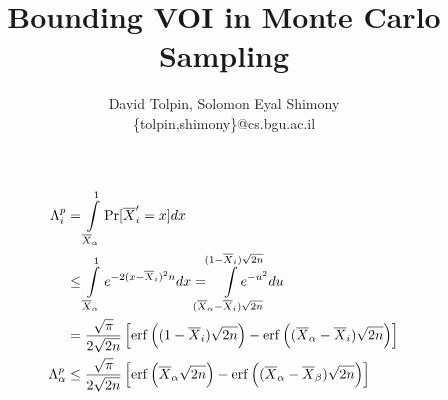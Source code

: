 \documentclass{article}
\title{Bounding VOI in Monte Carlo Sampling}
\author {David Tolpin, Solomon Eyal Shimony \\
\{tolpin,shimony\}@cs.bgu.ac.il}
\begin{document}
\maketitle

\begin{align*}
\Lambda_i^p&=\int\limits_{\overline X_\alpha}^1\Pr[\overline X_i'=x]dx\\
&\le \int\limits_{\overline X_\alpha}^1e^{-2(x-\overline X_i)^2n}dx
=\hspace{-1em}\int\limits_{(\overline X_\alpha - \overline X_i)\sqrt{2n}}^{(1- \overline X_i)\sqrt{2n}}\hspace{-2em}e^{-u^2}du\\
&=\frac {\sqrt \pi} {2 \sqrt {2n}}
  \left[\mathrm{erf}\left((1-\overline X_i)\sqrt {2n}\right)
      -\mathrm{erf}\left((\overline X_\alpha - \overline X_i)\sqrt{2n}\right)\right]\\
\Lambda_\alpha^p&\le\frac {\sqrt \pi} {2 \sqrt {2n}}
  \left[\mathrm{erf}\left(\overline X_\alpha\sqrt {2n}\right)
      -\mathrm{erf}\left((\overline X_\alpha - \overline X_\beta)\sqrt{2n}\right)\right]
\end{align*}



\end{document}
